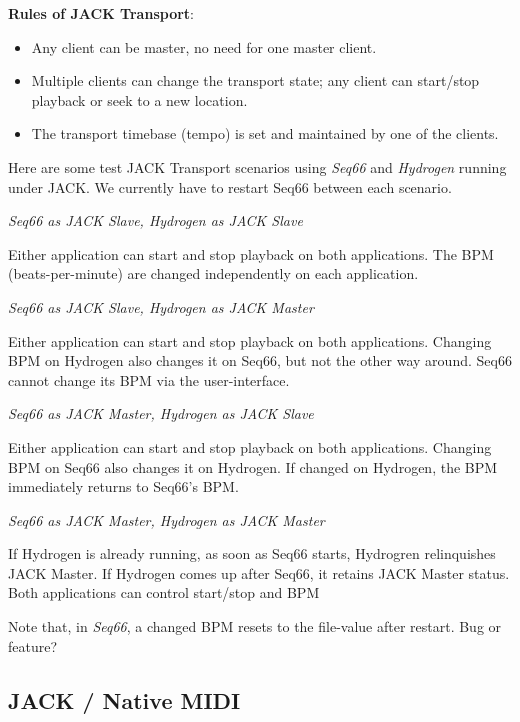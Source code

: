    \textbf{Rules of JACK Transport}:

   \begin{itemize}
      \item Any client can be master, no need for one master client.
      \item Multiple clients can change the transport state;
         any client can start/stop playback or seek to a new location.
      \item The transport timebase (tempo) is set and maintained by
         one of the clients.
   \end{itemize}

   Here are some test JACK Transport scenarios using
   \textsl{Seq66} and \textsl{Hydrogen} running under JACK.
   We currently have to restart Seq66 between each scenario.

   \textsl{Seq66 as JACK Slave, Hydrogen as JACK Slave}

      Either application can start and stop playback on both applications.
      The BPM (beats-per-minute) are changed independently on each application.

   \textsl{Seq66 as JACK Slave, Hydrogen as JACK Master}

      Either application can start and stop playback on both applications.
      Changing BPM on Hydrogen also changes it on Seq66, but not the other way
      around. Seq66 cannot change its BPM via the user-interface.

   \textsl{Seq66 as JACK Master, Hydrogen as JACK Slave}

      Either application can start and stop playback on both applications.
      Changing BPM on Seq66 also changes it on Hydrogen.  If changed on Hydrogen,
      the BPM immediately returns to Seq66's BPM.

   \textsl{Seq66 as JACK Master, Hydrogen as JACK Master}

      If Hydrogen is already running, as soon as Seq66 starts, Hydrogren
      relinquishes JACK Master.
      If Hydrogen comes up after Seq66, it retains JACK Master status.  Both
      applications can control start/stop and BPM

   Note that, in \textsl{Seq66}, a changed BPM resets to the file-value after
   restart.  Bug or feature?

\subsection{JACK / Native MIDI}
\label{subsec:jack_native_midi}

